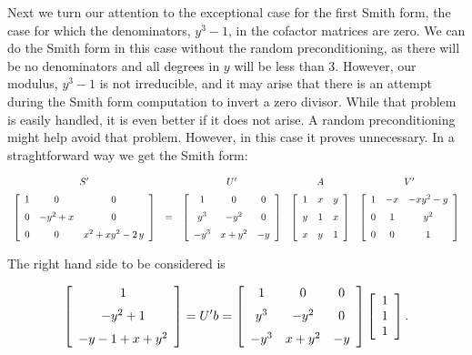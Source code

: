\documentclass[10pt]{article}
\begin{document}
Next we turn our attention to the exceptional case for the first Smith form, the case for which
the denominators, $y^3 - 1$, in the cofactor matrices are zero.  
We can do the Smith form in this case without the random preconditioning, as there
will be no denominators and all degrees in $y$ will be less than 3.  However,
our modulus, $y^3 - 1$ is not irreducible, and it may arise that there is an attempt
during the Smith form computation to invert a zero 
\newpage
divisor.  While that problem
is easily handled, it is even better if it does not arise.  A random preconditioning
might help avoid that problem.  However, in this case it proves unnecessary.
In a straghtforward way we get the Smith form:

\[
\begin{array}{ccccc}
S' & ~ & U' & A & V'\\\noalign{\medskip}

\left [\begin {array}{ccc} 1&0&0\\\noalign{\medskip}0&-{y}^{2}+x&0\\\noalign{\medskip}
0&0&{x}^{2}+x{y}^{2}-2\,y\end {array}\right ]
& = &
\left [\begin {array}{ccc} 1&0&0\\\noalign{\medskip}{y}^{3}&-{y}^{2}&0\\\noalign{\medskip}
-{y}^{3}&x+{y}^{2}&-y\end {array}\right ]
&
\left [\begin {array}{ccc} 1&x&y\\\noalign{\medskip}y&1&x\\\noalign{\medskip}
x&y&1\end {array}\right ]
&
\left [\begin {array}{ccc} 1&-x&-x{y}^{2}-y\\\noalign{\medskip}0&1&{y}^
{2}\\\noalign{\medskip}0&0&1\end {array}\right ]
\end{array}
\]

The right hand side to be considered %
is
 
\[ 
\left [\begin {array}{c} 1\\\noalign{\medskip}-{y}^{2}+1\\\noalign{\medskip}
-y-1+x+{y}^{2}\end {array}\right ]
= U'b = 
\left [\begin {array}{ccc} 1&0&0\\\noalign{\medskip}{y}^{3}&-{y}^{2}&0\\\noalign{\medskip}
-{y}^{3}&x+{y}^{2}&-y\end {array}\right ]
\left [\begin {array}{c} 1\\1\\1 \end {array}\right ].
\]
\end{document}
